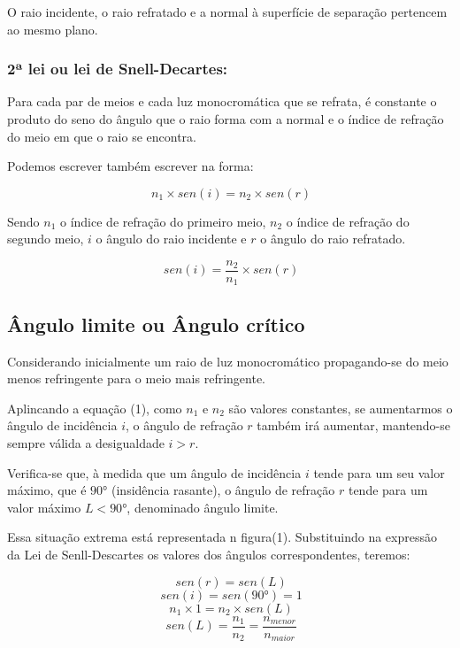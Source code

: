 \documentclass [a4paper, 12pt]{article}
\begin{document}
O raio incidente, o raio refratado e a normal à superfície de separação pertencem ao mesmo plano.

\subsubsection{2ª lei ou lei de Snell-Decartes:}

Para cada par de meios e cada luz monocromática que se refrata, é constante o produto do seno do ângulo que o raio forma com a normal e o índice de refração do meio em que o raio se encontra.

Podemos escrever também escrever na forma:

\begin{equation}
  \ n_{1} \times sen (i) = n_{2} \times sen (r)
\end{equation}

Sendo $n_{1}$ o índice de refração do primeiro meio, $n_{2}$ o índice de refração do segundo meio, $i$ o ângulo do raio incidente e $r$ o ângulo do raio refratado.

\begin{equation}
  \ sen (i) = \dfrac{n_{2}}{n_{1}} \times sen (r)
\end{equation}

\subsection{Ângulo limite ou Ângulo crítico}

Considerando inicialmente um raio de luz monocromático propagando-se do meio menos refringente para o meio mais refringente.

Aplincando a equação (1), como $n_{1}$ e $n_{2}$ são valores constantes, se aumentarmos o ângulo de incidência $i$, o ângulo de refração $r$ também irá aumentar, mantendo-se sempre válida a desigualdade $i > r$.

Verifica-se que, à medida que um ângulo de incidência $i$ tende para um seu valor máximo, que é $90$° (insidência rasante), o ângulo de refração $r$ tende para um valor máximo $L < 90$°, denominado ângulo limite.

Essa situação extrema está representada n figura(1). Substituindo na expressão da Lei de Senll-Descartes os valores dos ângulos correspondentes, teremos:

\begin{equation}
  \ sen(r) = sen(L)  
\end{equation}
\begin{equation}
  \ sen(i) = sen(90°) = 1  
\end{equation}
\begin{equation}
  \ n_{1} \times 1 = n_{2} \times sen(L) 
\end{equation}
\begin{equation}
  \ sen(L) = \dfrac{n_{1}}{n_{2}} = \dfrac{n_{menor}}{n_{maior}}  
\end{equation}
\end{document}
